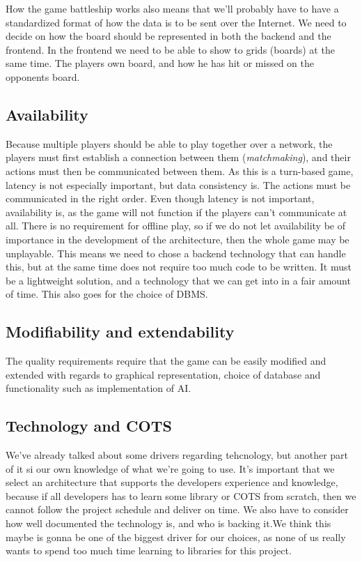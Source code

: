 How the game battleship works also means that we'll probably have to have a standardized format of how the data is to be sent over the Internet. We need to decide on how the board should be represented in both the backend and the frontend. In the frontend we need to be able to show to grids (boards) at the same time. The players own board, and how he has hit or missed on the opponents board. 

\subsection{Availability}
Because multiple players should be able to play together over a network, the players must first establish a connection between them (\textit{matchmaking}), and their actions must then be communicated between them. As this is a turn-based game, latency is not especially important, but data consistency is. The actions must be communicated in the right order. Even though latency is not important, availability is, as the game will not function if the players can't communicate at all. There is no requirement for offline play, so if we do not let availability be of importance in the development of the architecture, then the whole game may be unplayable. This means we need to chose a backend technology that can handle this, but at the same time does not require too much code to be written. It must be a lightweight solution, and a technology that we can get into in a fair amount of time. This also goes for the choice of DBMS.

\subsection{Modifiability and extendability}
The quality requirements require that the game can be easily modified and extended with regards to graphical representation, choice of database and functionality such as implementation of AI. 

\subsection{Technology and COTS}
We've already talked about some drivers regarding tehcnology, but another part of it si our own knowledge of what we're going to use. It's important that we select an architecture that supports the developers experience and knowledge, because if all developers has to learn some library or COTS from scratch, then we cannot follow the project schedule and deliver on time. We also have to consider how well documented the technology is, and who is backing it.We think this maybe is gonna be one of the biggest driver for our choices, as none of us really wants to spend too much time learning to libraries for this project.

